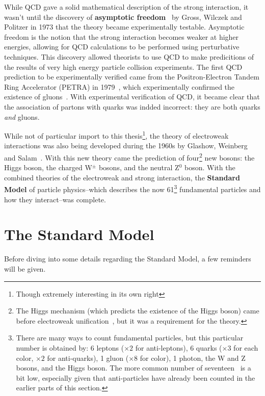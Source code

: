 While QCD gave a solid mathematical description of the strong interaction, it wasn't until the discovery of \textbf{asymptotic freedom}~\cite{AssFreedom1, AssFreedom2} by Gross, Wilczek and Politzer in 1973 that the theory became experimentally testable. Asymptotic freedom is the notion that the strong interaction becomes weaker at higher energies, allowing for QCD calculations to be performed using perturbative techniques. This discovery allowed theorists to use QCD to make predicitions of the results of very high energy particle collision experiments. The first QCD prediction to be experimentally verified came from the Positron-Electron Tandem Ring Accelerator (PETRA) in 1979~\cite{PETRA}, which experimentally confirmed the existence of gluons~\cite{GluonConfirmation}. With experimental verification of QCD, it became clear that the association of partons with quarks was indded incorrect: they are both quarks \textit{and} gluons.

While not of particular import to this thesis\footnote{Though extremely interesting in its own right}, the theory of electroweak interactions was also being developed during the 1960s by Glashow, Weinberg and Salam~\cite{Electroweak1, Electroweak2}. With this new theory came the prediction of four\footnote{The Higgs mechanism (which predicts the existence of the Higgs boson) came before electroweak unification~\cite{HiggsPaper}, but it was a requirement for the theory.} new bosons: the Higgs boson, the charged W$^{\pm}$ bosons, and the neutral Z$^{0}$ boson. With the combined theories of the electroweak and strong interaction, the \textbf{Standard Model} of particle physics--which describes the now 61\footnote{There are many ways to count fundamental particles, but this particular number is obtained by: 6 leptons ($\times 2$ for anti-leptons), 6 quarks ($\times 3$ for each color, $\times 2$ for anti-quarks), 1 gluon ($\times 8$ for color), 1 photon, the W and Z bosons, and the Higgs boson. The more common number of seventeen~\cite{ParticleNumber} is a bit low, especially given that anti-particles have already been counted in the earlier parts of this section.} fundamental particles and how they interact--was complete. 


\section{The Standard Model}

Before diving into some details regarding the Standard Model, a few reminders will be given.

